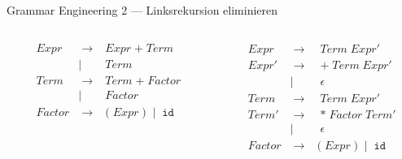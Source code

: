\documentclass{beamer}
\begin{document}
\begin{frame}{Grammar Engineering 2 --- Linksrekursion eliminieren}
  \begin{columns}
    \begin{column}{0.5\textwidth}
      \begin{alignat*}{2}
        & Expr   & \; \to \; & Expr \; \texttt{+} \; Term \\
              && \mid \;\; & Term \\
        & Term   & \; \to \; & Term \; \texttt{+} \; Factor \\
                && \mid \;\; & Factor \\
        & Factor & \; \to \; & \texttt{(} \; Expr \; \texttt{)} \; \mid \; \texttt{id}
      \end{alignat*}

    \end{column}
    \begin{column}{0.5\textwidth}
      \begin{alignat*}{2}
        & Expr   & \; \to \; & \; Term \; Expr' \\
        & Expr'  & \; \to \; & \; \texttt{+} \; Term \; Expr' \\
                && \mid \;\; & \; \epsilon \\
        & Term   & \; \to \; & \; Term \; Expr' \\
        & Term'  & \; \to \; & \; \texttt{*} \; Factor \; Term' \\
                && \mid \;\; & \; \epsilon \\
        & Factor & \; \to \; & \texttt{(} \; Expr \; \texttt{)} \; \mid \; \texttt{id}
      \end{alignat*}
    \end{column}
  \end{columns}

  \vfill


\end{frame}
\end{document}
